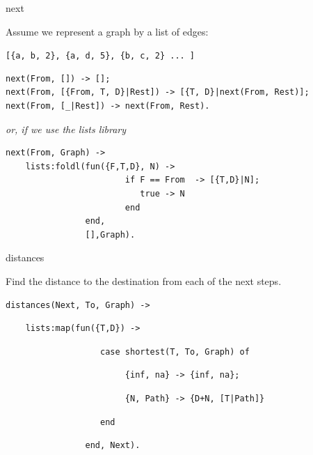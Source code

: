 \begin{frame}[fragile]{next}

  Assume we represent a graph by a list of edges:

  \vspace{10pt}\hspace{40pt}\texttt{[\{a, b, 2\}, \{a, d, 5\}, \{b, c, 2\} ... ]}  
  
\begin{verbatim}
next(From, []) -> [];
next(From, [{From, T, D}|Rest]) -> [{T, D}|next(From, Rest)];
next(From, [_|Rest]) -> next(From, Rest).
\end{verbatim}

\pause\vspace{10pt} 
{\em or, if we use the lists library}

\begin{verbatim}
next(From, Graph) ->
    lists:foldl(fun({F,T,D}, N) -> 
                        if F == From  -> [{T,D}|N];
                           true -> N
                        end
                end,
                [],Graph).
\end{verbatim}
\end{frame}

\begin{frame}[fragile]{distances}

  Find the distance to the destination from each of the next steps.

\vspace{20pt} \pause
  
\begin{verbatim}
distances(Next, To, Graph) ->
\end{verbatim}
\pause
\begin{verbatim}
    lists:map(fun({T,D}) ->   
\end{verbatim}
\pause
\begin{verbatim}
                   case shortest(T, To, Graph) of 
\end{verbatim}
\pause
\begin{verbatim}
                        {inf, na} -> {inf, na};
\end{verbatim}
\pause
\begin{verbatim}
                        {N, Path} -> {D+N, [T|Path]}
\end{verbatim}
\pause
\begin{verbatim}
                   end
\end{verbatim}
\begin{verbatim}
                end, Next).    
\end{verbatim}
\end{frame}

